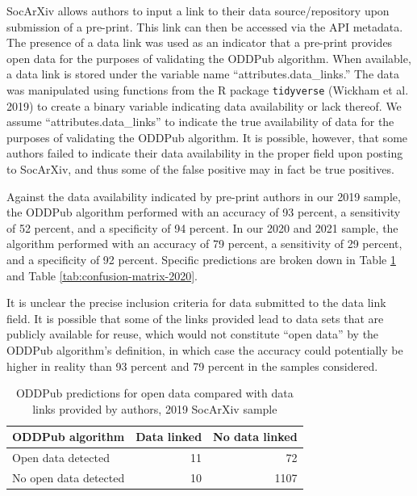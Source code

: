 \documentclass[
]{article}
\begin{document}
SocArXiv allows authors to input a link to their data source/repository upon submission of a pre-print. This link can then be accessed via the API metadata. The presence of a data link was used as an indicator that a pre-print provides open data for the purposes of validating the ODDPub algorithm. When available, a data link is stored under the variable name ``attributes.data\_links.'' The data was manipulated using functions from the R package \texttt{tidyverse} (Wickham et al. 2019) to create a binary variable indicating data availability or lack thereof. We assume ``attributes.data\_links'' to indicate the true availability of data for the purposes of validating the ODDPub algorithm. It is possible, however, that some authors failed to indicate their data availability in the proper field upon posting to SocArXiv, and thus some of the false positive may in fact be true positives.

Against the data availability indicated by pre-print authors in our 2019 sample, the ODDPub algorithm performed with an accuracy of 93 percent, a sensitivity of 52 percent, and a specificity of 94 percent. In our 2020 and 2021 sample, the algorithm performed with an accuracy of 79 percent, a sensitivity of 29 percent, and a specificity of 92 percent. Specific predictions are broken down in Table \ref{tab:confusion-matrix-2019} and Table \ref{tab:confusion-matrix-2020}.

It is unclear the precise inclusion criteria for data submitted to the data link field. It is possible that some of the links provided lead to data sets that are publicly available for reuse, which would not constitute ``open data'' by the ODDPub algorithm's definition, in which case the accuracy could potentially be higher in reality than 93 percent and 79 percent in the samples considered.

\begin{table}[!h]

\caption{\label{tab:confusion-matrix-2019}ODDPub predictions for open data compared with data links provided by authors, 2019 SocArXiv sample}
\centering
\begin{tabular}[t]{lrr}
\toprule
ODDPub algorithm & Data linked & No data linked\\
\midrule
Open data detected & 11 & 72\\
No open data detected & 10 & 1107\\
\bottomrule
\end{tabular}
\end{table}
\end{document}
